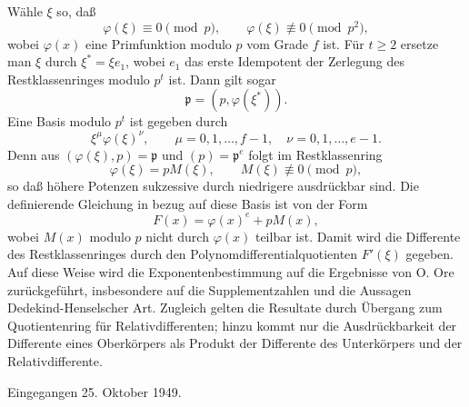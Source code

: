 \documentclass[11pt]{article}
\begin{document}
Wähle $\xi$ so, daß
\[
        \varphi(\xi)\equiv0\pmod p,
        \qquad
        \varphi(\xi)\not\equiv0\pmod {p^2},
\]
wobei $\varphi(x)$ eine Primfunktion modulo $p$ vom Grade $f$ ist. Für $t\ge2$ ersetze man $\xi$ durch $\xi^*=\xi e_1$, wobei $e_1$ das erste Idempotent der Zerlegung des Restklassenringes modulo $p^t$ ist. Dann gilt sogar
\[
        \mathfrak p=(p,\varphi(\xi^*)).
\]
Eine Basis modulo $p^t$ ist gegeben durch
\[
        \xi^{\mu}\varphi(\xi)^{\nu},
        \qquad
        \mu=0,1,\ldots,f-1,
        \quad
        \nu=0,1,\ldots,e-1.
\]
Denn aus $(\varphi(\xi),p)=\mathfrak p$ und $(p)=\mathfrak p^e$ folgt im Restklassenring
\[
        \varphi(\xi)=pM(\xi),
        \qquad M(\xi)\not\equiv0\pmod p,
\]
so daß höhere Potenzen sukzessive durch niedrigere ausdrückbar sind. Die definierende Gleichung in bezug auf diese Basis ist von der Form
\[
        F(x)=\varphi(x)^e+pM(x),
\]
wobei $M(x)$ modulo $p$ nicht durch $\varphi(x)$ teilbar ist. Damit wird die Differente des Restklassenringes durch den Polynomdifferentialquotienten $F'(\xi)$ gegeben. Auf diese Weise wird die Exponentenbestimmung auf die Ergebnisse von O. Ore zurückgeführt, insbesondere auf die Supplementzahlen und die Aussagen Dedekind-Henselscher Art. Zugleich gelten die Resultate durch Übergang zum Quotientenring für Relativdifferenten; hinzu kommt nur die Ausdrückbarkeit der Differente eines Oberkörpers als Produkt der Differente des Unterkörpers und der Relativdifferente.

\begin{center}
Eingegangen 25. Oktober 1949.
\end{center}
\end{document}
